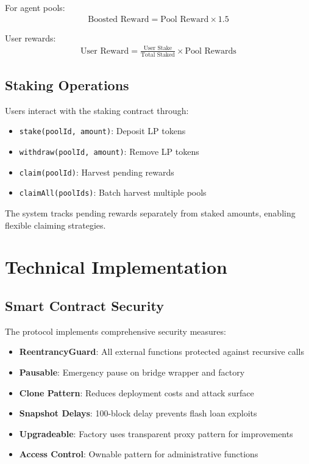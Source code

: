 \documentclass{article}
\begin{document}
For agent pools:
\begin{align}
\text{Boosted Reward} = \text{Pool Reward} \times 1.5
\end{align}

User rewards:
\begin{align}
\text{User Reward} = \frac{\text{User Stake}}{\text{Total Staked}} \times \text{Pool Rewards}
\end{align}

\subsection{Staking Operations}

Users interact with the staking contract through:
\begin{itemize}
    \item \texttt{stake(poolId, amount)}: Deposit LP tokens
    \item \texttt{withdraw(poolId, amount)}: Remove LP tokens
    \item \texttt{claim(poolId)}: Harvest pending rewards
    \item \texttt{claimAll(poolIds)}: Batch harvest multiple pools
\end{itemize}

The system tracks pending rewards separately from staked amounts, enabling flexible claiming strategies.

\section{Technical Implementation}

\subsection{Smart Contract Security}

The protocol implements comprehensive security measures:

\begin{itemize}
    \item \textbf{ReentrancyGuard}: All external functions protected against recursive calls
    \item \textbf{Pausable}: Emergency pause on bridge wrapper and factory
    \item \textbf{Clone Pattern}: Reduces deployment costs and attack surface
    \item \textbf{Snapshot Delays}: 100-block delay prevents flash loan exploits
    \item \textbf{Upgradeable}: Factory uses transparent proxy pattern for improvements
    \item \textbf{Access Control}: Ownable pattern for administrative functions
\end{itemize}
\end{document}
